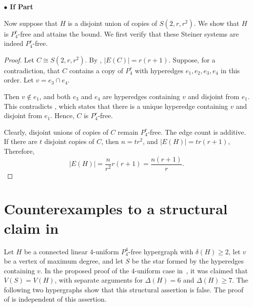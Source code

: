 \documentclass[11pt,a4paper]{article}
\newtheorem{lemma}[theorem]{Lemma}
\theoremstyle{definition}
\theoremstyle{remark}
\begin{document}
\noindent\textbf{$\bullet$ If Part}

\noindent Now suppose that $H$ is a disjoint union of copies of
$S(2,r,r^2)$. We show that $H$ is $P_4^r$-free and attains the bound. 
We first verify that these Steiner systems are indeed $P_4^r$-free.


\begin{proof}
Let $C\cong S(2,r,r^2)$. By ,
$|E(C)|=r(r+1).$
Suppose, for a contradiction, that $C$ contains a copy of $P_4^r$ with
hyperedges $e_1,e_2,e_3,e_4$ in this order. Let $v=e_3\cap e_4.$

Then $v\notin e_1$, and both $e_3$ and $e_4$ are hyperedges containing
$v$ and disjoint from $e_1$. This contradicts , which
states that there is a unique hyperedge containing $v$ and disjoint
from $e_1$. Hence, $C$ is $P_4^r$-free.

 Clearly, disjoint unions of copies of $C$ remain $P_4^r$-free. The edge
count is additive.
If there are $t$ disjoint copies of $C$, then $n = tr^2$, and $|E(H)| = tr(r+1)$, Therefore,
$$|E(H)| = \frac{n}{r^2}r(r+1) = \frac{n(r+1)}{r}.$$
\end{proof}

\section{Counterexamples to a structural claim in
\cite{zhang2025linear}}\label{counterex}

Let $H$ be a connected linear $4$-uniform $P_4^4$-free hypergraph with
$\delta(H)\geq 2$, let $v$ be a vertex of maximum degree, and let $S$
be the star formed by the hyperedges containing $v$. In the proposed
proof of the $4$-uniform case in~\cite{zhang2025linear}, it was claimed
that $V(S)=V(H)$, with separate arguments for $\Delta(H)=6$ and
$\Delta(H)\geq 7$. The following two hypergraphs show that this
structural assertion is false. The proof of  is independent
of this assertion.
\end{document}
